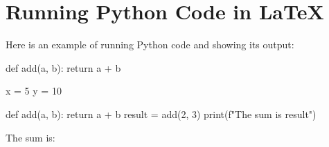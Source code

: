 \documentclass{article}
\begin{document}
\section{Running Python Code in LaTeX}

Here is an example of running Python code and showing its output:

\begin{pycode}
def add(a, b):
    return a + b
\end{pycode}

\begin{pycode}
x = 5
y = 10
\end{pycode}
 

\begin{pyverbatim}
def add(a, b):
    return a + b
result = add(2, 3)
print(f"The sum is {result}")
\end{pyverbatim}

The sum is: 
\end{document}
